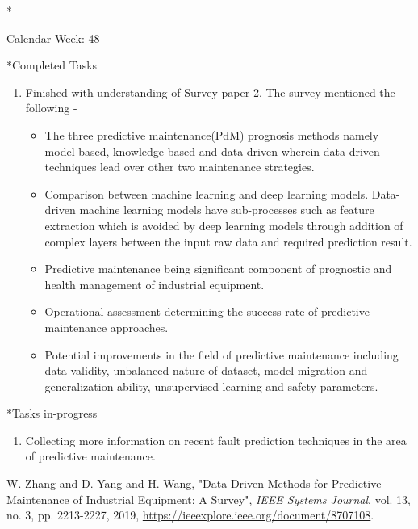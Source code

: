 \documentclass[11pt,a4paper]{article}
\begin{document}
\begin{section}*{Calendar Week: 48 \hfill \date{27 November, 2020}}

\begin{subsection}*{Completed Tasks}
    \begin{enumerate}
        \item
            Finished with understanding of Survey paper 2\cite{survey31}. The survey mentioned the following -
            \begin{itemize}
                \item The three predictive maintenance(PdM) prognosis methods namely model-based, knowledge-based and data-driven wherein data-driven techniques lead over other two maintenance strategies.  
                \item Comparison between machine learning and deep learning models. Data-driven machine learning models have sub-processes such as feature extraction which is avoided by deep learning models through addition of complex layers between the input raw data and required prediction result.
                \item Predictive maintenance being significant component of prognostic and health management of industrial equipment. 
                \item Operational assessment determining the success rate of predictive maintenance approaches.
                \item Potential improvements in the field of predictive maintenance including data validity, unbalanced nature of dataset, model migration and generalization ability, unsupervised learning and safety parameters.  
            \end{itemize}
             
    \end{enumerate}
\end{subsection}
\begin{subsection}*{Tasks in-progress}
    \begin{enumerate}
        \item
            Collecting more information on recent fault prediction techniques in the area of predictive maintenance. 
    \end{enumerate}
\end{subsection}
\begin{thebibliography}{9}
    {W. {Zhang} and D. {Yang} and H. {Wang}},
    "Data-Driven Methods for Predictive Maintenance of Industrial Equipment: A Survey",
    \textit{IEEE Systems Journal},
    vol. 13,
    no. 3,
    pp. 2213-2227,
    2019,
    \href{https://ieeexplore.ieee.org/document/8707108}{https://ieeexplore.ieee.org/document/8707108}.

    \end{thebibliography}
\end{section}
\end{document}
